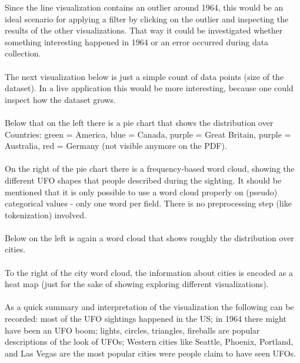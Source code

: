 \documentclass[bibliography=totoc]{article}
\begin{document}
Since the line visualization contains an outlier around 1964, this would
be an ideal scenario for applying a filter by clicking on the outlier and inspecting the results of the other
visualizations. That way
it could be investigated whether something interesting happened in 1964 or
an error occurred during data collection.
\\
\\
The next visualization below is just a simple count of data points (size of the dataset). 
In a live application this would be more interesting, because one could inspect how the 
dataset grows.
\\
\\
Below that on the left there is a pie chart that shows the distribution over Countries:
green = America, blue = Canada, purple = Great Britain, purple = Australia, red = Germany (not visible anymore on the PDF).
\\
\\
On the right of the pie chart there is a frequency-based word cloud, showing the different UFO shapes that 
people described during the sighting. It should be mentioned that it is only possible to
use a word cloud properly on (pseudo) categorical values - only one word per field.
There is no preprocessing step
(like tokenization) involved.
\\
\\
Below on the left is again a word cloud that shows roughly the distribution over cities.
\\
\\
To the right of the city word cloud, the information about cities is encoded as a 
heat map (just for the sake of showing exploring different visualizations).
\\
\\
As a quick summary and interpretation of the visualization the following can 
be recorded: most of the UFO sightings happened in the US; in 1964 there might have been 
an UFO boom; lights, circles, triangles, fireballs are popular descriptions of the look of UFOs;
Western cities like Seattle, Phoenix, Portland, and Las Vegas are the most popular cities were people claim
to have seen UFOs.
\\
\\
\end{document}
